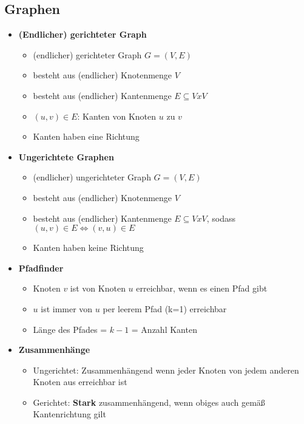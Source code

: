\subsection{Graphen}
    \begin{itemize}
        \item \textbf{(Endlicher) gerichteter Graph}
            \begin{itemize}
                \item (endlicher) gerichteter Graph $G = (V,E)$
                \item besteht aus (endlicher) Knotenmenge $V$
                \item besteht aus (endlicher) Kantenmenge $E \subseteq V x V$
                \item $(u,v) \in E$: Kanten von Knoten $u$ zu $v$
                \item Kanten haben eine Richtung
            \end{itemize}

        \item \textbf{Ungerichtete Graphen}
            \begin{itemize}
                \item (endlicher) ungerichteter Graph $G = (V,E)$
                \item besteht aus (endlicher) Knotenmenge $V$
                \item besteht aus (endlicher) Kantenmenge $E \subseteq V x V$, sodass $(u,v) \in E \Leftrightarrow (v,u) \in E$
                \item Kanten haben keine Richtung
            \end{itemize}

        \item \textbf{Pfadfinder}
            \begin{itemize}
                \item Knoten $v$ ist von Knoten $u$ erreichbar, wenn es einen Pfad gibt
                \item $u$ ist immer von $u$ per leerem Pfad (k=1) erreichbar
                \item Länge des Pfades = $k - 1$ = Anzahl Kanten
            \end{itemize}

        \item \textbf{Zusammenhänge}
            \begin{itemize}
                \item Ungerichtet: Zusammenhängend wenn jeder Knoten von jedem anderen Knoten aus erreichbar ist
                \item Gerichtet: \textbf{Stark} zusammenhängend, wenn obiges auch gemäß Kantenrichtung gilt
            \end{itemize}


\end{itemize}
